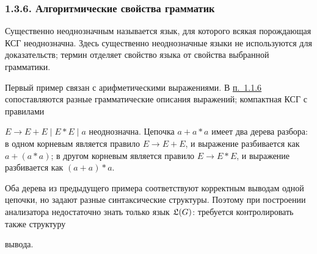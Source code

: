 \documentclass[mathserif,12pt,aspectratio=169]{beamer}
\def\DMref#1#2{{\color{blue}\underline{\hyperlink{#2}{#1}}}}
\begin{document}
\begin{frame}[t]
	\frametitle{1.3.6. Алгоритмические свойства грамматик }
	\setlength{\parskip}{1pt}
	\sloppy
	
	\begin{digress}
		Существенно неоднозначным называется язык, для которого всякая порождающая КСГ неоднозначна. Здесь существенно неоднозначные языки не используются для доказательств; термин отделяет свойство языка от свойства выбранной грамматики.
	\end{digress}
	
	\begin{example}
		Первый пример связан с арифметическими выражениями. В \DMref{п.~1.1.6}{1.1.6.} сопоставляются разные грамматические описания выражений; компактная КСГ с правилами 
		
		$E\to E+E\mid E*E\mid a$ неоднозначна. Цепочка $a+a*a$ имеет два дерева разбора: в одном корневым является правило $E\to E+E$, и выражение разбивается как $a+(a*a)$; в другом корневым является правило $E\to E*E$, и выражение разбивается как $(a+a)*a$.
	\end{example}
	
	
	Оба дерева из предыдущего примера соответствуют корректным выводам одной цепочки, но задают разные синтаксические структуры. Поэтому при построении анализатора недостаточно знать только язык $\frak{L}(G)$: требуется контролировать также структуру 
	
	вывода.
	
\end{frame}
\end{document}
